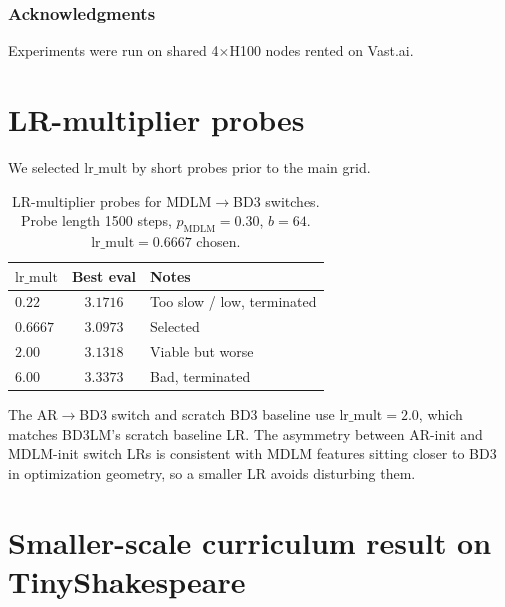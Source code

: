 \documentclass{article}
\begin{document}
\subsubsection*{Acknowledgments}
Experiments were run on shared 4$\times$H100 nodes rented on Vast.ai.




\appendix

\section{LR-multiplier probes}
\label{app:lr}

We selected $\mathrm{lr\_mult}$ by short probes prior to the main grid.

\begin{table}[h]
\centering
\caption{LR-multiplier probes for MDLM$\to$BD3 switches. Probe length 1500 steps, $p_{\mathrm{MDLM}}{=}0.30$, $b{=}64$. $\mathrm{lr\_mult}{=}0.6667$ chosen.}
\small
\begin{tabular}{lcl}
\toprule
$\mathrm{lr\_mult}$ & Best eval & Notes \\
\midrule
$0.22$   & $3.1716$         & Too slow / low, terminated \\
$0.6667$ & $\mathbf{3.0973}$ & Selected \\
$2.00$   & $3.1318$         & Viable but worse \\
$6.00$   & $3.3373$         & Bad, terminated \\
\bottomrule
\end{tabular}
\end{table}

The AR$\to$BD3 switch and scratch BD3 baseline use $\mathrm{lr\_mult}{=}2.0$, which matches BD3LM's scratch baseline LR. The asymmetry between AR-init and MDLM-init switch LRs is consistent with MDLM features sitting closer to BD3 in optimization geometry, so a smaller LR avoids disturbing them.

\section{Smaller-scale curriculum result on TinyShakespeare}
\label{app:tinysh}
\end{document}

